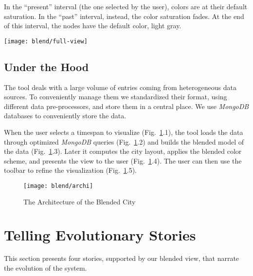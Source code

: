In the ``present'' interval (\ie the one selected by the user), colors are at their default saturation.
In the ``past''  interval, instead, the color saturation fades.
At the end of this interval, the nodes have the default color, \ie light gray.



\begin{figure*}[ht]
\centering
\texttt{[image: blend/full-view]}
\caption{View of the City With All the Activities}
\label{fig:full-view}
\end{figure*}

\subsection{Under the Hood}

The tool deals with a large volume of entries coming from heterogeneous data sources.
To conveniently manage them we standardized their format, using different data pre-processors, and store them in a central place.
We use \textit{MongoDB} databases to conveniently store the data.

When the user selects a timespan to visualize (Fig.~\ref{fig:archi}.1), the tool loads the data through optimized \textit{MongoDB} queries  (Fig.~\ref{fig:archi}.2) and builds the blended model of the data  (Fig.~\ref{fig:archi}.3).
Later it computes the city layout, applies the blended color scheme, and presents the view to the user (Fig.~\ref{fig:archi}.4).
The user can then use the toolbar to refine the visualization (Fig.~\ref{fig:archi}.5).

\begin{figure}[h!]
\centering
\texttt{[image: blend/archi]}
\caption{The Architecture of the Blended City}
\label{fig:archi}
\end{figure}



\section{Telling Evolutionary Stories}\label{sec:stories}

This section presents four stories, supported by our blended view, that narrate the evolution of the \pha system.

